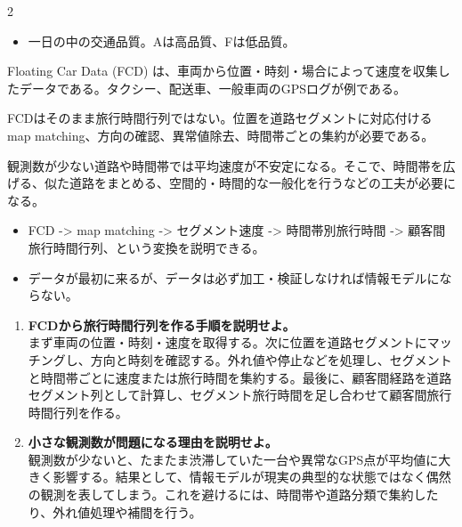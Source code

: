 \clearpage
{}
\begin{multicols}{2}\footnotesize\raggedcolumns
{}
\begin{itemize}
\item 一日の中の交通品質。Aは高品質、Fは低品質。
\end{itemize}
Floating Car Data (FCD) は、車両から位置・時刻・場合によって速度を収集したデータである。タクシー、配送車、一般車両のGPSログが例である。\par

FCDはそのまま旅行時間行列ではない。位置を道路セグメントに対応付ける map matching、方向の確認、異常値除去、時間帯ごとの集約が必要である。\par

観測数が少ない道路や時間帯では平均速度が不安定になる。そこで、時間帯を広げる、似た道路をまとめる、空間的・時間的な一般化を行うなどの工夫が必要になる。\par
{}
\begin{itemize}
\item FCD -> map matching -> セグメント速度 -> 時間帯別旅行時間 -> 顧客間旅行時間行列、という変換を説明できる。
\item データが最初に来るが、データは必ず加工・検証しなければ情報モデルにならない。
\end{itemize}
\begin{enumerate}
\item \textbf{FCDから旅行時間行列を作る手順を説明せよ。}\\まず車両の位置・時刻・速度を取得する。次に位置を道路セグメントにマッチングし、方向と時刻を確認する。外れ値や停止などを処理し、セグメントと時間帯ごとに速度または旅行時間を集約する。最後に、顧客間経路を道路セグメント列として計算し、セグメント旅行時間を足し合わせて顧客間旅行時間行列を作る。
\item \textbf{小さな観測数が問題になる理由を説明せよ。}\\観測数が少ないと、たまたま渋滞していた一台や異常なGPS点が平均値に大きく影響する。結果として、情報モデルが現実の典型的な状態ではなく偶然の観測を表してしまう。これを避けるには、時間帯や道路分類で集約したり、外れ値処理や補間を行う。
\end{enumerate}
\end{multicols}

